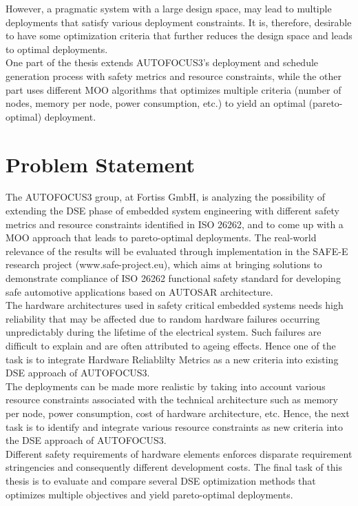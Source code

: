 However, a pragmatic system with a large design space, may lead to multiple deployments that satisfy various deployment constraints. It is, therefore, desirable to have some optimization criteria that further reduces the design space and leads to optimal deployments.\\ 

One part of the thesis extends AUTOFOCUS3's deployment and schedule generation process with safety metrics and resource constraints, while the other part uses different MOO algorithms that optimizes multiple criteria (number of nodes, memory per node, power consumption, etc.) to yield an optimal (pareto-optimal) deployment.


\section{Problem Statement}

The AUTOFOCUS3 group, at Fortiss GmbH, is analyzing the possibility of extending the DSE phase of embedded system engineering with different safety metrics and resource constraints identified in ISO 26262, and to come up with a MOO approach that leads to pareto-optimal deployments. The real-world relevance of the results will be evaluated through implementation in the SAFE-E research project (www.safe-project.eu), which aims at bringing solutions to demonstrate compliance of ISO 26262 functional safety standard for developing safe automotive applications based on AUTOSAR architecture.\\

The hardware architectures used in safety critical embedded systems needs high reliability that may be affected due to random hardware failures occurring unpredictably during the lifetime of the electrical system. Such failures are difficult to explain and are often attributed to ageing effects. Hence one of the task is to integrate Hardware Reliablilty Metrics as a new criteria into existing DSE approach of AUTOFOCUS3.\\

The deployments can be made more realistic by taking into account various resource constraints associated with the technical architecture such as memory per node, power consumption, cost of hardware architecture, etc. Hence, the next task is to identify and integrate various resource constraints as new criteria into the DSE approach of AUTOFOCUS3.\\ 

Different safety requirements of hardware elements enforces disparate requirement stringencies and consequently different development costs. The final task of this thesis is to evaluate and compare several DSE optimization methods that optimizes multiple objectives and yield pareto-optimal deployments.  



